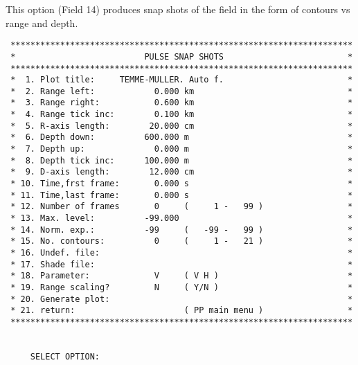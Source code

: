 This option (Field 14) produces snap shots of the field in the form of
contours vs range and depth.

\small
\begin{verbatim}
 *********************************************************************
 *                          PULSE SNAP SHOTS                         *
 *********************************************************************
 *  1. Plot title:     TEMME-MULLER. Auto f.                         *
 *  2. Range left:            0.000 km                               *
 *  3. Range right:           0.600 km                               *
 *  4. Range tick inc:        0.100 km                               *
 *  5. R-axis length:        20.000 cm                               *
 *  6. Depth down:          600.000 m                                *
 *  7. Depth up:              0.000 m                                *
 *  8. Depth tick inc:      100.000 m                                *
 *  9. D-axis length:        12.000 cm                               *
 * 10. Time,frst frame:       0.000 s                                *
 * 11. Time,last frame:       0.000 s                                *
 * 12. Number of frames       0     (     1 -   99 )                 *
 * 13. Max. level:          -99.000                                  *
 * 14. Norm. exp.:          -99     (   -99 -   99 )                 *
 * 15. No. contours:          0     (     1 -   21 )                 *
 * 16. Undef. file:                                                  *
 * 17. Shade file:                                                   *
 * 18. Parameter:             V     ( V H )                          *
 * 19. Range scaling?         N     ( Y/N )                          *
 * 20. Generate plot:                                                *
 * 21. return:                      ( PP main menu )                 *
 *********************************************************************


     SELECT OPTION: 
\end{verbatim} 
\normalsize

